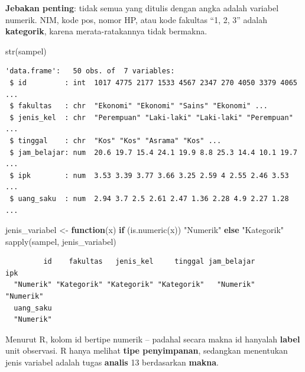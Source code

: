 \documentclass[
  indonesian,
  letterpaper,
]{book}
\newenvironment{Shaded}{\begin{snugshade}}{\end{snugshade}}
\newcommand{\CommentTok}[1]{\textcolor[rgb]{0.37,0.37,0.37}{#1}}
\newcommand{\ControlFlowTok}[1]{\textcolor[rgb]{0.00,0.23,0.31}{\textbf{#1}}}
\newcommand{\FunctionTok}[1]{\textcolor[rgb]{0.28,0.35,0.67}{#1}}
\newcommand{\NormalTok}[1]{\textcolor[rgb]{0.00,0.23,0.31}{#1}}
\newcommand{\OtherTok}[1]{\textcolor[rgb]{0.00,0.23,0.31}{#1}}
\newcommand{\SpecialCharTok}[1]{\textcolor[rgb]{0.37,0.37,0.37}{#1}}
\newcommand{\StringTok}[1]{\textcolor[rgb]{0.13,0.47,0.30}{#1}}
\begin{document}
\textbf{Jebakan penting}: tidak semua yang ditulis dengan angka adalah
variabel numerik. NIM, kode pos, nomor HP, atau kode fakultas ``1, 2,
3'' adalah \textbf{kategorik}, karena merata-ratakannya tidak bermakna.

\begin{Shaded}
\begin{Highlighting}[]
\FunctionTok{str}\NormalTok{(sampel)}
\end{Highlighting}
\end{Shaded}

\begin{verbatim}
'data.frame':   50 obs. of  7 variables:
 $ id         : int  1017 4775 2177 1533 4567 2347 270 4050 3379 4065 ...
 $ fakultas   : chr  "Ekonomi" "Ekonomi" "Sains" "Ekonomi" ...
 $ jenis_kel  : chr  "Perempuan" "Laki-laki" "Laki-laki" "Perempuan" ...
 $ tinggal    : chr  "Kos" "Kos" "Asrama" "Kos" ...
 $ jam_belajar: num  20.6 19.7 15.4 24.1 19.9 8.8 25.3 14.4 10.1 19.7 ...
 $ ipk        : num  3.53 3.39 3.77 3.66 3.25 2.59 4 2.55 2.46 3.53 ...
 $ uang_saku  : num  2.94 3.7 2.5 2.61 2.47 1.36 2.28 4.9 2.27 1.28 ...
\end{verbatim}

\begin{Shaded}
\begin{Highlighting}[]
\NormalTok{jenis\_variabel }\OtherTok{\textless{}{-}} \ControlFlowTok{function}\NormalTok{(x) }\ControlFlowTok{if}\NormalTok{ (}\FunctionTok{is.numeric}\NormalTok{(x)) }\StringTok{"Numerik"} \ControlFlowTok{else} \StringTok{"Kategorik"}
\FunctionTok{sapply}\NormalTok{(sampel, jenis\_variabel)}
\end{Highlighting}
\end{Shaded}

\begin{verbatim}
         id    fakultas   jenis_kel     tinggal jam_belajar         ipk 
  "Numerik" "Kategorik" "Kategorik" "Kategorik"   "Numerik"   "Numerik" 
  uang_saku 
  "Numerik" 
\end{verbatim}

Menurut R, kolom id bertipe numerik -- padahal secara makna id hanyalah
\textbf{label} unit observasi. R hanya melihat \textbf{tipe
penyimpanan}, sedangkan menentukan jenis variabel adalah tugas
\textbf{analis} 13 berdasarkan \textbf{makna}.

\begin{Shaded}
\end{Shaded}
\end{document}
